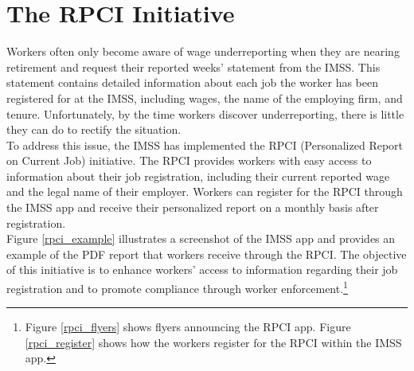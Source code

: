 \documentclass[10pt, oneside]{book}
\begin{document}
\section{The RPCI Initiative}

Workers often only become aware of wage underreporting when they are nearing retirement and request their reported weeks' statement from the IMSS. This statement contains detailed information about each job the worker has been registered for at the IMSS, including wages, the name of the employing firm, and tenure. Unfortunately, by the time workers discover underreporting, there is little they can do to rectify the situation. \\ 

To address this issue, the IMSS has implemented the RPCI (Personalized Report on Current Job) initiative. The RPCI provides workers with easy access to information about their job registration, including their current reported wage and the legal name of their employer. Workers can register for the RPCI through the IMSS app and receive their personalized report on a monthly basis after registration. \\

Figure \ref{rpci_example} illustrates a screenshot of the IMSS app and provides an example of the PDF report that workers receive through the RPCI. The objective of this initiative is to enhance workers' access to information regarding their job registration and to promote compliance through worker enforcement.\footnote{Figure \ref{rpci_flyers} shows flyers announcing the RPCI app. Figure \ref{rpci_register} shows how the workers register for the RPCI within the IMSS app.} \\ 
\end{document}
